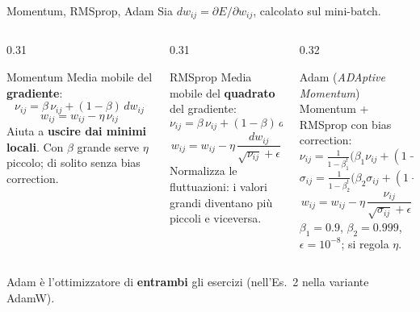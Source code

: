 \documentclass[aspectratio=169]{beamer}
\begin{document}
\begin{frame}{Momentum, RMSprop, Adam}
  \footnotesize
  Sia $dw_{ij} = \partial E/\partial w_{ij}$, calcolato sul mini-batch.
  \begin{columns}[T]
    \begin{column}{0.31\textwidth}
      \begin{block}{Momentum}
        Media mobile del \textbf{gradiente}:
        \[ \nu_{ij} = \beta\,\nu_{ij} + (1-\beta)\,dw_{ij} \]
        \[ w_{ij} = w_{ij} - \eta\,\nu_{ij} \]
        Aiuta a \textbf{uscire dai minimi locali}. Con $\beta$ grande serve
        $\eta$ piccolo; di solito senza bias correction.
      \end{block}
    \end{column}
    \begin{column}{0.31\textwidth}
      \begin{block}{RMSprop}
        Media mobile del \textbf{quadrato} del gradiente:
        \[ \nu_{ij} = \beta\,\nu_{ij} + (1-\beta)\,dw_{ij}^2 \]
        \[ w_{ij} = w_{ij} - \eta\,\frac{dw_{ij}}{\sqrt{\nu_{ij}}+\epsilon} \]
        Normalizza le fluttuazioni: i valori grandi diventano più piccoli e
        viceversa.
      \end{block}
    \end{column}
    \begin{column}{0.32\textwidth}
      \begin{block}{Adam (\emph{ADAptive Momentum})}
        Momentum + RMSprop con bias correction:
        \[ \nu_{ij} = \tfrac{1}{1-\beta_1^t}\big(\beta_1\nu_{ij} + (1-\beta_1)dw_{ij}\big) \]
        \[ \sigma_{ij} = \tfrac{1}{1-\beta_2^t}\big(\beta_2\sigma_{ij} + (1-\beta_2)dw_{ij}^2\big) \]
        \[ w_{ij} = w_{ij} - \eta\,\frac{\nu_{ij}}{\sqrt{\sigma_{ij}}+\epsilon} \]
        $\beta_1=0.9$, $\beta_2=0.999$, $\epsilon=10^{-8}$; si regola $\eta$.
      \end{block}
    \end{column}
  \end{columns}
  \begin{center}
    Adam è l'ottimizzatore di \textbf{entrambi} gli esercizi (nell'Es.\ 2 nella
    variante AdamW).
  \end{center}
\end{frame}
\end{document}
